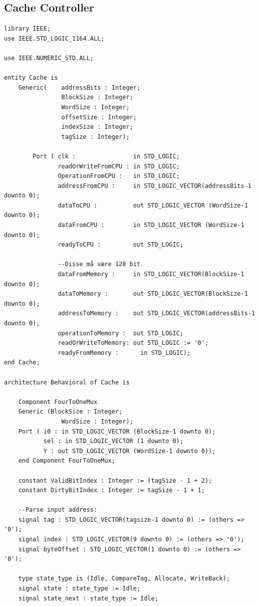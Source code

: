 \documentclass{article}
\begin{document}
\subsection{Cache Controller}
\begin{lstlisting}
library IEEE;
use IEEE.STD_LOGIC_1164.ALL;

use IEEE.NUMERIC_STD.ALL;

entity Cache is
    Generic(    addressBits : Integer;
                BlockSize : Integer;
                WordSize : Integer;
                offsetSize : Integer;
                indexSize : Integer;
                tagSize : Integer);

        Port ( clk :                in STD_LOGIC;
               readOrWriteFromCPU : in STD_LOGIC;
               OperationFromCPU :   in STD_LOGIC;
               addressFromCPU :     in STD_LOGIC_VECTOR(addressBits-1 downto 0);
               dataToCPU :          out STD_LOGIC_VECTOR (WordSize-1 downto 0);
               dataFromCPU :        in STD_LOGIC_VECTOR (WordSize-1 downto 0);
               readyToCPU :         out STD_LOGIC;

               --Disse må være 128 bit
               dataFromMemory :     in STD_LOGIC_VECTOR(BlockSize-1 downto 0);
               dataToMemory :       out STD_LOGIC_VECTOR(BlockSize-1 downto 0);
               addressToMemory :    out STD_LOGIC_VECTOR(addressBits-1 downto 0);
               operationToMemory :  out STD_LOGIC;
               readOrWriteToMemory: out STD_LOGIC := '0';
               readyFromMemory :      in STD_LOGIC);
end Cache;

architecture Behavioral of Cache is

    Component FourToOneMux
    Generic (BlockSize : Integer;
                WordSize : Integer);
    Port ( i0 : in STD_LOGIC_VECTOR (BlockSize-1 downto 0);
           sel : in STD_LOGIC_VECTOR (1 downto 0);
           Y : out STD_LOGIC_VECTOR (WordSize-1 downto 0));
    end Component FourToOneMux;

    constant ValidBitIndex : Integer := (tagSize - 1 + 2);
    constant DirtyBitIndex : Integer := tagSize - 1 + 1;

    --Parse input address:
    signal tag : STD_LOGIC_VECTOR(tagsize-1 downto 0) := (others => '0');
    signal index : STD_LOGIC_VECTOR(9 downto 0) := (others => '0');
    signal byteOffset : STD_LOGIC_VECTOR(1 downto 0) := (others => '0');

    type state_type is (Idle, CompareTag, Allocate, WriteBack);
    signal state : state_type := Idle;
    signal state_next : state_type := Idle;


\end{lstlisting}
\end{document}
